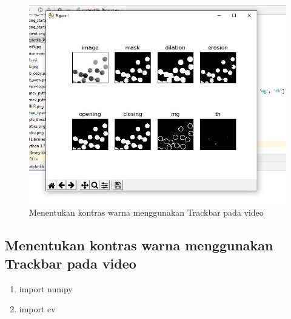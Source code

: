 \newpage
\begin{figure}[ht]
\centering
\includegraphics[scale=0.5]{figures/2,58.jpg}
\caption{Menentukan kontras warna menggunakan Trackbar pada video}
\label{contoh}
\end{figure}







\newpage
\subsection{Menentukan kontras warna menggunakan Trackbar pada video}

\begin{enumerate}
	\item import numpy
	\item import cv
\end{enumerate}

